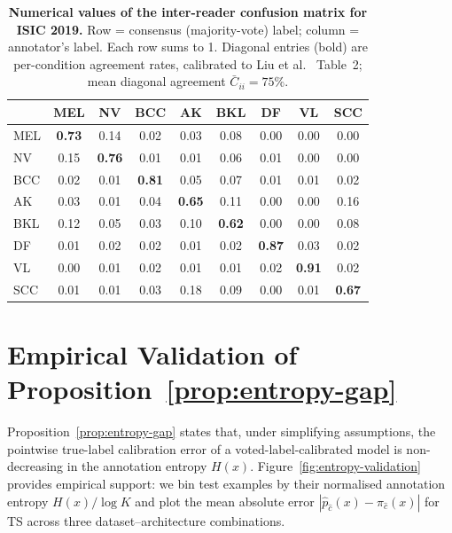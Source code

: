 \documentclass[10pt,journal,compsoc]{IEEEtran}
\begin{document}
\begin{table}[t]
  \centering
  \caption{
    \textbf{Numerical values of the inter-reader confusion matrix for ISIC 2019.}
    Row = consensus (majority-vote) label; column = annotator's label.
    Each row sums to 1.  Diagonal entries (bold) are per-condition agreement rates,
    calibrated to Liu et al.~\cite{liu2020deep} Table~2; mean diagonal agreement $\bar{C}_{ii}=75\%$.
  }
  \label{tab:isic-confusion}
  \small
  \setlength{\tabcolsep}{4pt}
  \begin{tabular}{lcccccccc}
    \toprule
    & MEL & NV & BCC & AK & BKL & DF & VL & SCC \\
    \midrule
    MEL  & \textbf{0.73} & 0.14 & 0.02 & 0.03 & 0.08 & 0.00 & 0.00 & 0.00 \\
    NV   & 0.15 & \textbf{0.76} & 0.01 & 0.01 & 0.06 & 0.01 & 0.00 & 0.00 \\
    BCC  & 0.02 & 0.01 & \textbf{0.81} & 0.05 & 0.07 & 0.01 & 0.01 & 0.02 \\
    AK   & 0.03 & 0.01 & 0.04 & \textbf{0.65} & 0.11 & 0.00 & 0.00 & 0.16 \\
    BKL  & 0.12 & 0.05 & 0.03 & 0.10 & \textbf{0.62} & 0.00 & 0.00 & 0.08 \\
    DF   & 0.01 & 0.02 & 0.02 & 0.01 & 0.02 & \textbf{0.87} & 0.03 & 0.02 \\
    VL   & 0.00 & 0.01 & 0.02 & 0.01 & 0.01 & 0.02 & \textbf{0.91} & 0.02 \\
    SCC  & 0.01 & 0.01 & 0.03 & 0.18 & 0.09 & 0.00 & 0.01 & \textbf{0.67} \\
    \bottomrule
  \end{tabular}
\end{table}

\section{Empirical Validation of Proposition~\ref{prop:entropy-gap}}
\label{app:entropy-validation}

Proposition~\ref{prop:entropy-gap} states that, under simplifying assumptions, the pointwise true-label calibration error of a voted-label-calibrated model is non-decreasing in the annotation entropy $H(x)$.  Figure~\ref{fig:entropy-validation} provides empirical support: we bin test examples by their normalised annotation entropy $H(x)/\log K$ and plot the mean absolute error $|\hat{p}_{\hat{c}}(x) - \pi_{\hat{c}}(x)|$ for TS across three dataset--architecture combinations.
\end{document}
